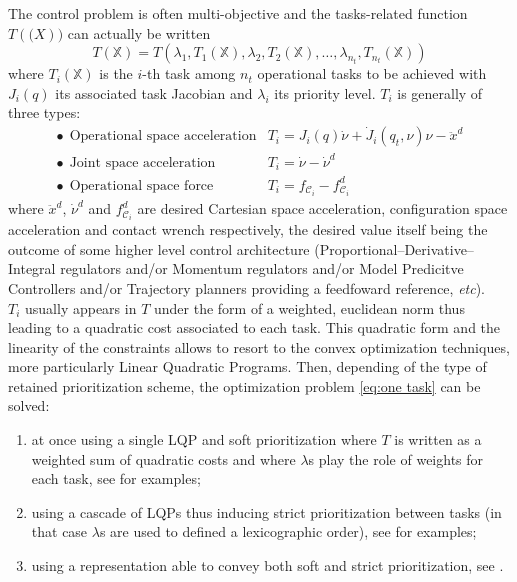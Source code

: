\documentclass[12pt,a4paper,twoside]{article}
\begin{document}
The control problem is often multi-objective and the tasks-related function $T(\mathbb(X))$ can actually be written
\begin{equation}\label{eq:multi task}
T(\mathbb{X}) = T\left(\lambda_1, T_1(\mathbb{X}), \lambda_2, T_2(\mathbb{X}), \dots, \lambda_{n_t},T_{n_t}(\mathbb{X})\right)
\end{equation}
where $T_i(\mathbb{X})$ is the $i$-th task among $n_t$ operational tasks to be achieved with $J_i(q)$ its associated task Jacobian and $\lambda_i$ its priority level. $T_i$ is generally of three types:
\begin{equation}
\begin{array}{ll}
\bullet~~\text{Operational space acceleration} & T_i={J_i}({q}){\dot{\nu}} + {\dot{J}_i}({q}_t,{\nu}){\nu} -{\ddot{x}}^{d} \\
\bullet~~\text{Joint space acceleration}       & T_i={\dot{\nu}}-{\dot{\nu}}^{d} \\
\bullet~~\text{Operational space force}        & T_i={f}_{\mathcal{C}_i}-{f}_{\mathcal{C}_i}^{d}
\end{array}
\end{equation}
where ${\ddot{x}}^{d}$, ${\dot{\nu}}^{d}$ and ${f}_{\mathcal{C}_i}^{d}$ are desired Cartesian space acceleration, configuration space acceleration and contact wrench respectively, the desired value itself being the outcome of some higher level control architecture (Proportional--Derivative--Integral regulators and/or Momentum regulators and/or Model Predicitve Controllers and/or Trajectory planners providing a feedfoward reference, \textit{etc}).\\

$T_i$ usually appears in $T$ under the form of a weighted, euclidean norm thus leading to a quadratic cost associated to each task. This quadratic form and the linearity of the constraints allows to resort to the convex optimization techniques, more particularly Linear Quadratic Programs. Then, depending of the type of retained prioritization scheme, the optimization problem \ref{eq:one task} can be solved:
\begin{enumerate}
\item at once using a single LQP and soft prioritization where $T$ is written as a weighted sum of quadratic costs and where $\lambda$s play the role of weights for each task, see \cite{Salini2011,bouyarmane2011using} for examples;
\item using a cascade of LQPs thus inducing strict prioritization between tasks (in that case $\lambda$s are used to defined a lexicographic order), see \cite{Saab13,herzog2014balancing,hierarchicalq} for examples;
\item using a representation able to convey both soft and strict prioritization, see \cite{liu-AutRob2015,liu-AutRobSI2015}.
\end{enumerate}
\end{document}
